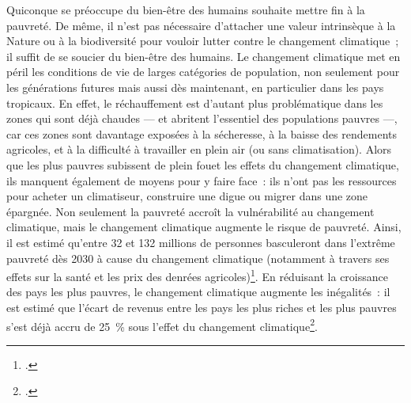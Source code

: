 \documentclass[a5paper,french,openany]{memoir}
\begin{document}
Quiconque se préoccupe du bien-être des humains souhaite mettre fin à la pauvreté. 
De même, il n'est pas nécessaire d'attacher une valeur intrinsèque à la Nature ou à la biodiversité pour vouloir lutter contre le changement climatique~; il suffit de se soucier du bien-être des humains. Le changement climatique met en péril les conditions de vie de larges catégories de population, non seulement pour les générations futures mais aussi dès maintenant, %
en particulier dans les pays tropicaux. En effet, le réchauffement est d'autant plus problématique dans les zones qui sont déjà chaudes --- et abritent l'essentiel des populations pauvres ---, car ces zones sont davantage exposées à la sécheresse, à la baisse des rendements agricoles, et à la difficulté à travailler en plein air (ou sans climatisation). Alors que les plus pauvres subissent de plein fouet les effets du changement climatique, ils manquent également de moyens pour y faire face~: %
ils n'ont pas les ressources pour acheter un climatiseur, construire une digue ou migrer dans une zone épargnée. Non seulement la pauvreté accroît la vulnérabilité au changement climatique, mais le changement climatique augmente le risque de pauvreté. Ainsi, il est estimé qu'entre 32 et 132 millions de personnes basculeront dans l'extrême pauvreté dès 2030 à cause du changement climatique (notamment à travers ses effets sur la santé et les prix des denrées agricoles)\footnote{\cite{jafino_revised_2020}.}. En réduisant la croissance des pays les plus pauvres, le changement climatique augmente les inégalités~: il est estimé que l'écart de revenus entre les pays les plus riches et les plus pauvres s'est déjà accru de 25~\% sous l'effet du changement climatique\footnote{\cite{diffenbaugh_global_2019,khalfan_climate_2023}.}. %

\end{document}
